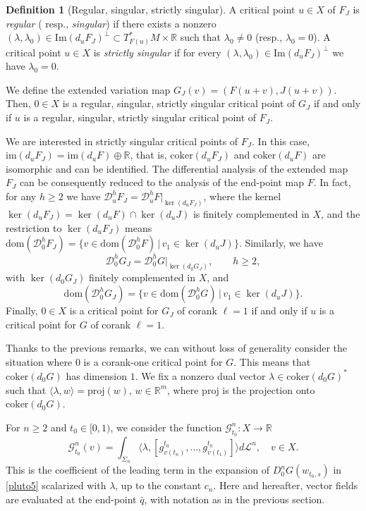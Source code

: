 \documentclass[12pt, reqno]{amsart}
\theoremstyle{plain}
\theoremstyle{definition}
\newtheorem{definition}[theorem]{Definition}
\theoremstyle{remark}
\numberwithin{equation}{section}
\newcommand{\R}{\mathbb{R}}
\newcommand{\D}{\mathcal{D}}
\renewcommand{\L}{\mathcal{L}}
\newcommand{\0}{\theta}
\newcommand{\la}{\lambda}
\newcommand{\1}{{-1}}
\newcommand{\q}{\bar q}
\renewcommand{\l}{\ell}
\renewcommand{\=}{\coloneqq}
\renewcommand{\.}{\dots}
\newcommand{\mc}{\mathcal}
\newcommand{\IM}{\mathrm{Im}}
\newcommand{\proj}{\mathrm{proj}}
\newcommand{\coker}{\mathrm{coker}}
\newcommand{\dom}{\mathrm{dom}}
\newcommand{\be}{\begin{equation}}
\newcommand{\ee}{\end{equation}}
\begin{document}
	
	\begin{definition}[Regular, singular, strictly singular]\label{defi:stricts}	
		A critical point  $u\in X$ of $ F_J$ is {\em regular} ({\color{black} resp.,} {\em singular}) if there exists a nonzero $(\lambda,\lambda_0)\in 
	\IM(d_u F_J  )^\perp
	\subset T_{F(u)}^*M\times \R$ such that $\lambda_0\ne 0$ (resp., $\lambda_0= 0$). 
	A critical point  $u\in X$ is {\em strictly singular} if for every $(\lambda,\lambda_0)\in 
	\IM(d_u F_J  )^\perp$ we have  $\lambda_0=0$.
	
	\end{definition}
	
	
	We  define the extended variation map $G_J (v) = (F(u+v), J(u+v))$. Then, $0\in X$ is a regular, singular, strictly singular critical point of $G_J$ if and only if  $u$ is a regular, singular, strictly singular critical point of $F_J$.


We are interested in strictly singular critical points of $F_J$. In this case,   $ \mathrm{im}(d_u F_J)=\mathrm{im}(d_u F)\oplus \R$, that is, 
$\coker (d_u F_J)$ and $\coker (d_u F)$ are isomorphic and can be identified.
	The differential analysis of the extended map  $F_J$ can be consequently   reduced to the analysis of the end-point map $F$.
	In fact, for any $h\geq 2$ we have
	$
	\mc{D}_u^h F_J = \mc{D}_u^hF\big|_{\ker(d_u F_J)} $,
	where  the kernel $\ker(d_u F_J)=\ker(d_uF)\cap \ker(d_uJ)$ is   finitely complemented in $X$, and the restriction to	$\ker(d_u F_J)$ means $\dom(\D_0^hF_J)=\{v\in\dom(\D_0^hF)\,|\,v_1\in\ker(d_uJ)\}$.
	Similarly, we have   
\be\label{62}
	\mc{D}_0^h G_J = \mc{D}_0^hG\big|_{\ker(d_0 G_J)} ,\qquad h\geq 2,
	\ee
with $\ker(d_0 G_J) $    finitely complemented in $X$, and
\be
 \label{621}
 \dom(\D_0^hG_J)=\{v\in\dom(\D_0^hG)\,|\,v_1\in\ker(d_uJ)\}.
\ee
Finally, $0\in X$ is a critical point for $G_J$ of corank $\l=1$ if and only if $u$ is a critical point for $G$ of corank $\l=1$.

 

Thanks to the previous remarks, we can without loss of generality consider the situation where
  $0$ is a corank-one critical point for $G$. This means that $\coker(d_0 G)$ has dimension $1$.
We fix a nonzero dual vector  $\la\in\coker(d_0 G)^*$ such that
$
 \langle \la, w\rangle =\proj(w)$, $w\in \R^m$, where $\proj$ is the projection onto $\coker(d_0 G)$.
 
For $n\geq 2$ and  $t_0\in[0,1)$, we consider the function $\mc G^n_{t_0}:X \to\R$
\begin{equation} \label{mom}
\mc G^n _{t_0}(v) = \int_{\Sigma_n } \langle \la,[ g_{v(t_n)}^{t_0} , \., g_{v(t_1)}^{t_0}] \rangle d\L^n 
,\quad 
v\in X .
\end{equation}
This is the coefficient of the leading term in the expansion of $D_0^nG(w_{t_0,s} ) $ in \eqref{pluto5} scalarized with $\lambda$, up to the constant $c_n$.
Here and hereafter, vector fields are evaluated at the end-point $\q  $, with notation as in the previous section.
 
\end{document}
